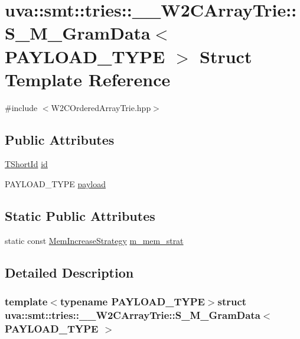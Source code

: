 \hypertarget{structuva_1_1smt_1_1tries_1_1_____w2_c_array_trie_1_1_s___m___gram_data}{}\section{uva\+:\+:smt\+:\+:tries\+:\+:\+\_\+\+\_\+\+W2\+C\+Array\+Trie\+:\+:S\+\_\+\+M\+\_\+\+Gram\+Data$<$ P\+A\+Y\+L\+O\+A\+D\+\_\+\+T\+Y\+P\+E $>$ Struct Template Reference}
\label{structuva_1_1smt_1_1tries_1_1_____w2_c_array_trie_1_1_s___m___gram_data}


{\ttfamily \#include $<$W2\+C\+Ordered\+Array\+Trie.\+hpp$>$}

\subsection*{Public Attributes}
\begin{DoxyCompactItemize}
\item 
\hyperlink{namespaceuva_1_1smt_1_1hashing_adcf22e1982ad09d3a63494c006267469}{T\+Short\+Id} \hyperlink{structuva_1_1smt_1_1tries_1_1_____w2_c_array_trie_1_1_s___m___gram_data_a56e5998ad052457084d62495c4db4eec}{id}
\item 
P\+A\+Y\+L\+O\+A\+D\+\_\+\+T\+Y\+P\+E \hyperlink{structuva_1_1smt_1_1tries_1_1_____w2_c_array_trie_1_1_s___m___gram_data_ac2a195c43c50814014c62157798c4c8a}{payload}
\end{DoxyCompactItemize}
\subsection*{Static Public Attributes}
\begin{DoxyCompactItemize}
\item 
static const \hyperlink{classuva_1_1smt_1_1tries_1_1alloc_1_1_mem_increase_strategy}{Mem\+Increase\+Strategy} \hyperlink{structuva_1_1smt_1_1tries_1_1_____w2_c_array_trie_1_1_s___m___gram_data_ab43d2623c5c8458997acfe0962581de9}{m\+\_\+mem\+\_\+strat}
\end{DoxyCompactItemize}


\subsection{Detailed Description}
\subsubsection*{template$<$typename P\+A\+Y\+L\+O\+A\+D\+\_\+\+T\+Y\+P\+E$>$struct uva\+::smt\+::tries\+::\+\_\+\+\_\+\+W2\+C\+Array\+Trie\+::\+S\+\_\+\+M\+\_\+\+Gram\+Data$<$ P\+A\+Y\+L\+O\+A\+D\+\_\+\+T\+Y\+P\+E $>$}


